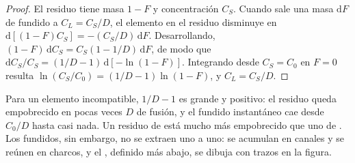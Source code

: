 \begin{proof}
El residuo tiene masa $1 - F$ y concentración $C_S$. Cuando sale una masa
$\mathrm dF$ de fundido a $C_L = C_S/D$, el elemento en el residuo
disminuye en $\mathrm d[(1 - F)C_S] = -(C_S/D)\,\mathrm dF$. Desarrollando,
$(1 - F)\,\mathrm dC_S = C_S(1 - 1/D)\,\mathrm dF$, de modo que
$\mathrm dC_S/C_S = (1/D - 1)\,\mathrm d[-\ln(1 - F)]$. Integrando desde
$C_S = C_0$ en $F = 0$ resulta $\ln(C_S/C_0) = (1/D - 1)\ln(1 - F)$, y
$C_L = C_S/D$.
\end{proof}

Para un elemento incompatible, $1/D - 1$ es grande y positivo: el residuo queda
empobrecido en pocas veces $D$ de fusión, y el fundido instantáneo cae
desde $C_0/D$ hasta casi nada. Un residuo de  está mucho más
empobrecido que uno de . Los fundidos, sin embargo, no se extraen
uno a uno: se acumulan en canales y se reúnen en charcos, y el ,
definido más abajo, se dibuja con trazos en la figura.

